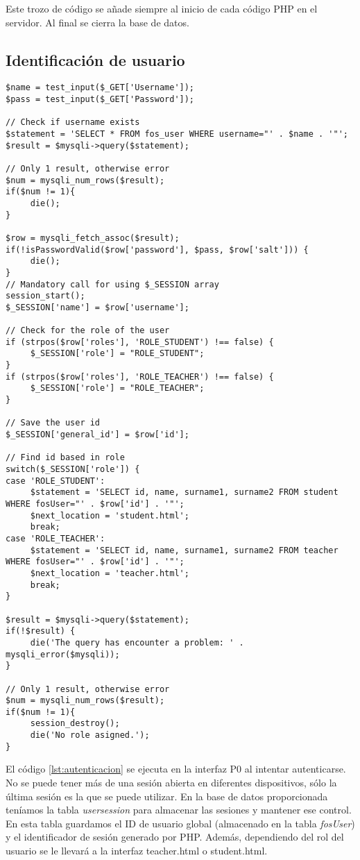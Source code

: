 Este trozo de código se añade siempre al inicio de cada código PHP en el servidor. Al final se cierra la base de datos.\\

\subsection{Identificación de usuario}
\label{diseno-e-implementacion:logica-negocio:identificacion}

\noindent
\begin{lstlisting}[caption=Autenticación del usuario.,label={lst:autenticacion}]
$name = test_input($_GET['Username']);
$pass = test_input($_GET['Password']);
   
// Check if username exists
$statement = 'SELECT * FROM fos_user WHERE username="' . $name . '"'; 
$result = $mysqli->query($statement);

// Only 1 result, otherwise error
$num = mysqli_num_rows($result);
if($num != 1){
     die();
}

$row = mysqli_fetch_assoc($result);
if(!isPasswordValid($row['password'], $pass, $row['salt'])) {
     die();
}
// Mandatory call for using $_SESSION array
session_start();
$_SESSION['name'] = $row['username'];

// Check for the role of the user
if (strpos($row['roles'], 'ROLE_STUDENT') !== false) {
     $_SESSION['role'] = "ROLE_STUDENT";
}
if (strpos($row['roles'], 'ROLE_TEACHER') !== false) {
     $_SESSION['role'] = "ROLE_TEACHER";
}

// Save the user id
$_SESSION['general_id'] = $row['id'];
  
// Find id based in role
switch($_SESSION['role']) {
case 'ROLE_STUDENT':
     $statement = 'SELECT id, name, surname1, surname2 FROM student WHERE fosUser="' . $row['id'] . '"';
     $next_location = 'student.html';
     break;	
case 'ROLE_TEACHER':
     $statement = 'SELECT id, name, surname1, surname2 FROM teacher WHERE fosUser="' . $row['id'] . '"';
     $next_location = 'teacher.html';
     break;
}    

$result = $mysqli->query($statement);
if(!$result) {
     die('The query has encounter a problem: ' . mysqli_error($mysqli));
}
  
// Only 1 result, otherwise error
$num = mysqli_num_rows($result);
if($num != 1){
     session_destroy();
     die('No role asigned.');
}
\end{lstlisting}

El código \ref{lst:autenticacion} se ejecuta en la interfaz P0 al intentar autenticarse. No se puede tener más de una sesión abierta en diferentes dispositivos, sólo la última sesión es la que se puede utilizar. En la base de datos proporcionada teníamos la tabla \textit{usersession} para almacenar las sesiones y mantener ese control. En esta tabla guardamos el ID de usuario global (almacenado en la tabla \textit{fosUser}) y el identificador de sesión generado por PHP. Además, dependiendo del rol del usuario se le llevará a la interfaz teacher.html o student.html.\\


